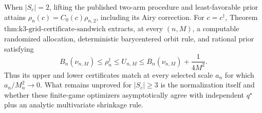 When \(|S_c|=2\), lifting the published two-arm procedure and least-favorable prior attains \(\rho_n(c)=C_0(c)\rho_{n,2}\), including its Airy correction. For \(c=c^\dagger\), Theorem \(\text{thm:k3-grid-certificate-sandwich}\) extracts, at every \((n,M)\), a computable randomized allocation, deterministic barycentered orbit rule, and rational prior satisfying
\[
 B_n(\nu_{n,M})\leq\rho_n^\dagger\leq U_{n,M}
 \leq B_n(\nu_{n,M})+\frac{1}{4M^2}.
\]
Thus its upper and lower certificates match at every selected scale \(a_n\) for which \(a_n/M_n^2\to0\). What remains unproved for \(|S_c|\geq3\) is the normalization itself and whether these finite-game optimizers asymptotically agree with independent \(q^\star\) plus an analytic multivariate shrinkage rule.